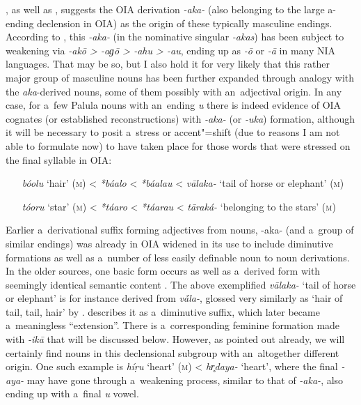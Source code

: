 \citet[15]{morgenstierne1941}, as well as \citet[29]{buddruss1967}, suggests the OIA derivation \textit{-aka-} (also belonging to the large a-ending declension in OIA) as the origin of these typically masculine endings. According to \citet[222]{masica1991}, this \textit{-aka-} (in the nominative singular \textit{-akas}) has been subject to weakening via \textit{-akō {\textgreater} -aɡō {\textgreater} -ahu {\textgreater} -au}, ending up as \textit{-ō} or \textit{-\={a}} in many NIA languages. That may be so, but I also hold it for very likely that this rather major group of masculine nouns has been further expanded through analogy with the \textit{aka}-derived nouns, some of them possibly with an~adjectival origin. In any case, for a~few Palula nouns with an~ending \textit{u} there is indeed evidence of OIA cognates (or established reconstructions) with \textit{-aka-} (or \textit{-uka}) formation, although it will be necessary to posit a~stress or accent"=shift (due to reasons I am not able to formulate now) to have taken place for those words that were stressed on the final syllable in OIA: 

\begin{itemize}[itemsep=0pt, leftmargin=]
\item[\textit{bóolu} `hair' (\textsc{m})] {\textless} \textit{*báalo} {\textless} \textit{*báalau} {\textless} \textit{vālaka-} `tail of horse or elephant' (\textsc{m})
\item[\textit{tóoru} `star' (\textsc{m})] {\textless} \textit{*táaro} {\textless} \textit{*táarau} {\textless} \textit{tāraká-} `belonging to the stars' (\textsc{m})
\end{itemize}

Earlier a~derivational suffix forming adjectives from nouns, -aka- (and a~group of similar endings) was already in OIA widened in its use to include diminutive formations as well as a~number of less easily definable noun to noun derivations. In the older sources, one basic form occurs as well as a~derived form with seemingly identical semantic content \citep[1222]{whitney1960}. The above exemplified \textit{vālaka-} `tail of horse or elephant' is for instance derived from \textit{v\'{\={a}}la-}, glossed very similarly as `hair of tail, tail, hair' by \citet[12056]{turner1966}. \citet[222]{masica1991} describes it as a~diminutive suffix, which later became a~meaningless ``extension''. There is a~corresponding \citep[1181, 1222]{whitney1960} feminine formation made with \textit{-ikā} that will be discussed below. However, as pointed out already, we will certainly find nouns in this declensional subgroup with an~altogether different origin. One such example is \textit{híṛu} `heart' (\textsc{m}) {\textless} \textit{hr̥daya-} `heart', where the final \textit{-aya-} may have gone through a~weakening process, similar to that of \textit{-aka-}, also ending up with a~final \textit{u} vowel.


